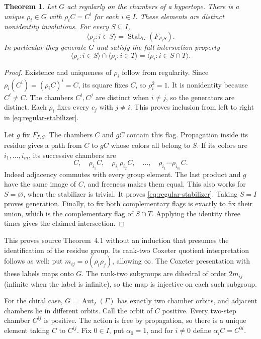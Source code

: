 \documentclass[11pt,a4paper]{article}
\newtheorem{theorem}{Theorem}[section]
\newcommand{\gen}[1]{\langle#1\rangle}
\newcommand{\Aut}{\operatorname{Aut}}
\newcommand{\Stab}{\operatorname{Stab}}
\begin{document}
\begin{theorem}\label{thm:regular}
Let $G$ act regularly on the chambers of a hypertope.  There is a unique
$\rho_i\in G$ with $\rho_iC=C^i$ for each $i\in I$.  These elements are
distinct nonidentity involutions.  For every $S\subseteq I$,
\begin{equation}\label{eq:regular-stabilizer}
       \gen{\rho_i:i\in S}=\Stab_G(F_{I\setminus S}).
\end{equation}
In particular they generate $G$ and satisfy the full intersection property
\[
 \gen{\rho_i:i\in S}\cap\gen{\rho_i:i\in T}
                  =\gen{\rho_i:i\in S\cap T}.
\]
\end{theorem}
\begin{proof}
Existence and uniqueness of $\rho_i$ follow from regularity.  Since
$\rho_i(C^i)=(\rho_iC)^i=C$, its square fixes $C$, so $\rho_i^2=1$.
It is nonidentity because $C^i\ne C$.  The chambers $C^i,C^j$ are distinct
when $i\ne j$, so the generators are distinct.  Each $\rho_i$ fixes
every $c_j$ with $j\ne i$.  This proves inclusion from left to right in
\eqref{eq:regular-stabilizer}.

Let $g$ fix $F_{I\setminus S}$.  The chambers $C$ and $gC$ contain this
flag.  Propagation inside its residue gives a path from $C$ to $gC$ whose
colors all belong to $S$.  If its colors are $i_1,\ldots,i_m$, its
successive chambers are
\[
 C,\quad \rho_{i_1}C,\quad
 \rho_{i_1}\rho_{i_2}C,\quad\ldots,\quad
 \rho_{i_1}\cdots\rho_{i_m}C.
\]
Indeed adjacency commutes with every group element.  The last product and
$g$ have the same image of $C$, and freeness makes them equal.  This also
works for $S=\varnothing$, when the stabilizer is trivial.  It proves
\eqref{eq:regular-stabilizer}.  Taking $S=I$ proves generation.
Finally, to fix both complementary flags is exactly to fix their union,
which is the complementary flag of $S\cap T$.  Applying the identity
three times gives the claimed intersection.
\end{proof}

This proves source Theorem~4.1 without an induction that presumes the
identification of the residue group.  Its rank-two Coxeter quotient
interpretation follows as well: put $m_{ij}=o(\rho_i\rho_j)$, allowing
$\infty$.  The Coxeter presentation with these labels maps onto $G$.
The rank-two subgroups are dihedral of order $2m_{ij}$ (infinite when the
label is infinite), so the map is injective on each such subgroup.

For the chiral case, $G=\Aut_I(\Gamma)$ has exactly two chamber orbits,
and adjacent chambers lie in different orbits.  Call the orbit of $C$
positive.  Every two-step chamber $C^{ij}$ is positive.  The action is
free by propagation, so there is a unique element taking $C$ to $C^{ij}$.
Fix $0\in I$, put $\alpha_0=1$, and for $i\ne0$ define
$\alpha_iC=C^{0i}$.
\end{document}
